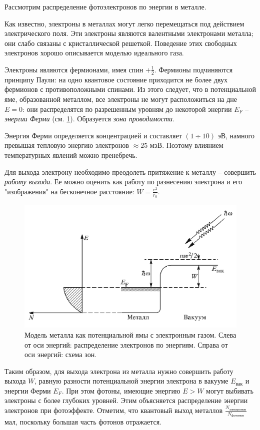\documentclass[12pt,a4paper]{article}
\begin{document}
	Рассмотрим распределение фотоэлектронов по энергии в металле.
	
	Как известно, электроны в металлах могут легко перемещаться под действием электрического поля. Эти электроны являются валентными электронами металла; они слабо связаны с кристаллической решеткой. Поведение этих свободных электронов хорошо описывается моделью идеального газа.
	
	Электроны являются фермионами, имея спин $+\frac{1}{2}$. Фермионы подчиняются принципу Паули: на одно квантовое состояние приходится не более двух фермионов с противоположными спинами. Из этого следует, что в потенциальной яме, образованной металлом, все электроны не могут расположиться на дне $E = 0$: они распределятся по разрешенным уровням до некоторой энергии $E_F$ -- \textit{энергии Ферми} (см. \ref{fig:metal}). Образуется \textit{зона проводимости}.
	
	Энергия Ферми определяется концентрацией и составляет $(1\div10)$ эВ, намного превышая тепловую энергию электронов $\approx 25$ мэВ. Поэтому влиянием температурных явлений можно пренебречь.
	
	Для выхода электрону необходимо преодолеть притяжение к металлу -- совершить \textit{работу выхода}. Ее можно оценить как работу по разнесению электрона и его "изображения" на бесконечное расстояние: $W = \frac{e^2}{r_0}$.
	
	\begin{figure}[H]
		\centering
		\includegraphics[scale=0.5]{res/metal.png}
		\caption{\centering
				 Модель металла как потенциальной ямы с электронным газом.
				 Слева от оси энергий: распределение электронов по энергиям.
				 Справа от оси энергий: схема зон.}
		\label{fig:metal}
	\end{figure}
	
	Таким образом, для выхода электрона из металла нужно совершить работу выхода $W$, равную разности потенциальной энергии электрона в вакууме $E_{\text{вак}}$ и энергии Ферми $E_F$. При этом фотоны, имеющие энергию $E > W$ могут выбивать электроны с более глубоких уровней. Этим объясняется распределение энергии электронов при фотоэффекте. Отметим, что квантовый выход металлов $\frac{N_{\text{электронов}}}{N_{\text{фотонов}}}$ мал, поскольку большая часть фотонов отражается.
\end{document}
